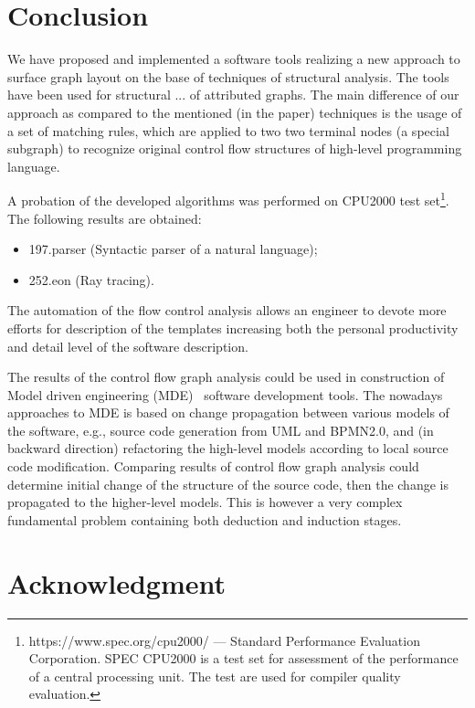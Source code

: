 \documentclass[conference]{IEEEtran}
\begin{document}
\section{Conclusion}
We have proposed and implemented a software tools realizing a new approach to surface graph layout on the base of techniques of structural analysis.  The tools have been used for structural ... of attributed graphs.  The main difference of our approach as compared to the mentioned (in the paper) techniques is the usage of a set of matching rules, which are applied to two two terminal nodes (a special subgraph) to recognize original control flow structures of high-level programming language.

A probation of the developed algorithms was performed on CPU2000 test set\footnote{https://www.spec.org/cpu2000/ --- Standard Performance Evaluation Corporation.  SPEC CPU2000 is a test set for assessment of the performance of a central processing unit. The test are used for compiler quality evaluation.}.  The following results are obtained:
\begin{itemize}
\item 197.parser (Syntactic parser of a natural language);
\item 252.eon (Ray tracing).
\end{itemize}

The automation of the flow control analysis allows an engineer to devote more efforts for description of the templates increasing both the personal productivity and detail level of the software description.

The results of the control flow graph analysis could be used in construction of Model driven engineering (MDE)~\cite{book,eugeneai} software development tools.  The nowadays approaches to MDE is based on change propagation between various models of the software, e.g., source code generation from UML and BPMN2.0, and (in backward direction) refactoring the high-level models according to local source code modification.  Comparing results of control flow graph analysis could determine initial change of the structure of the source code, then the change is propagated to the higher-level models.  This is however a very complex fundamental problem containing both deduction and induction stages.


\section*{Acknowledgment}
\end{document}
